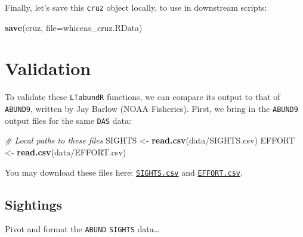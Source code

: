 \documentclass[
]{book}
\newenvironment{Shaded}{\begin{snugshade}}{\end{snugshade}}
\newcommand{\AttributeTok}[1]{\textcolor[rgb]{0.13,0.29,0.53}{#1}}
\newcommand{\CommentTok}[1]{\textcolor[rgb]{0.56,0.35,0.01}{\textit{#1}}}
\newcommand{\FunctionTok}[1]{\textcolor[rgb]{0.13,0.29,0.53}{\textbf{#1}}}
\newcommand{\NormalTok}[1]{#1}
\newcommand{\OtherTok}[1]{\textcolor[rgb]{0.56,0.35,0.01}{#1}}
\newcommand{\StringTok}[1]{\textcolor[rgb]{0.31,0.60,0.02}{#1}}
\begin{document}
Finally, let's save this \texttt{cruz} object locally, to use in downstream scripts:

\begin{Shaded}
\begin{Highlighting}[]
\FunctionTok{save}\NormalTok{(cruz, }\AttributeTok{file=}\StringTok{\textquotesingle{}whiceas\_cruz.RData\textquotesingle{}}\NormalTok{)}
\end{Highlighting}
\end{Shaded}

\hypertarget{validation}{%
\section*{Validation}\label{validation}}

To validate these \texttt{LTabundR} functions, we can compare its output to that of \texttt{ABUND9}, written by Jay Barlow (NOAA Fisheries). First, we bring in the \texttt{ABUND9} output files for the same \texttt{DAS} data:

\begin{Shaded}
\begin{Highlighting}[]
\CommentTok{\# Local paths to these files}
\NormalTok{SIGHTS }\OtherTok{\textless{}{-}} \FunctionTok{read.csv}\NormalTok{(}\StringTok{\textquotesingle{}data/SIGHTS.csv\textquotesingle{}}\NormalTok{)}
\NormalTok{EFFORT }\OtherTok{\textless{}{-}} \FunctionTok{read.csv}\NormalTok{(}\StringTok{\textquotesingle{}data/EFFORT.csv\textquotesingle{}}\NormalTok{)}
\end{Highlighting}
\end{Shaded}

You may download these files here: \href{https://raw.githubusercontent.com/emk-noaa/LTAvignette/main/data/SIGHTS.csv?token=GHSAT0AAAAAACFPESQVEDYQZ5I77WTDK2WIZGRKVMA}{\texttt{SIGHTS.csv}} and \href{https://raw.githubusercontent.com/emk-noaa/LTAvignette/main/data/EFFORT.csv?token=GHSAT0AAAAAACFPESQVOUD6HRSILDUWOFF2ZGRKU6A}{\texttt{EFFORT.csv}}.

\hypertarget{sightings}{%
\subsection*{Sightings}\label{sightings}}

Pivot and format the \texttt{ABUND} \texttt{SIGHTS} data\ldots{}
\end{document}
